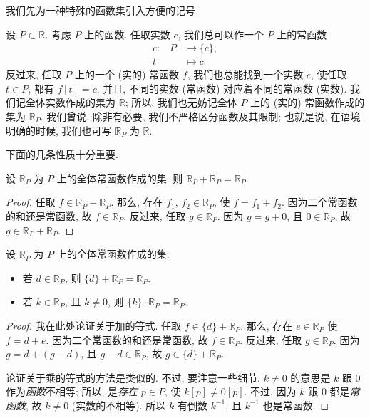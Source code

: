 我们先为一种特殊的函数集引入方便的记号.

设 $P \subset \mathbb{R}$. 考虑 $P$ 上的函数. 任取实数 $c$, 我们总可以作一个 $P$ 上的常函数
\begin{align*}
    \text{$c$:} \quad
    P & \to \{ c \}, \\
    t & \mapsto c.
\end{align*}
反过来, 任取 $P$ 上的一个 (实的) 常函数 $f$, 我们也总能找到一个实数 $c$, 使任取 $t \in P$, 都有 $f[t] = c$. 并且, 不同的实数 (常函数) 对应着不同的常函数 (实数). 我们记全体实数作成的集为 $\mathbb{R}$; 所以, 我们也无妨记全体 $P$ 上的 (实的) 常函数作成的集为 $\mathbb{R}_{P}$. 我们曾说, 除非有必要, 我们不严格区分函数及其限制; 也就是说, 在语境明确的时候, 我们也可写 $\mathbb{R}_{P}$ 为 $\mathbb{R}$.

下面的几条性质十分重要.

\begin{theorem}
    设 $\mathbb{R}_{P}$ 为 $P$ 上的全体常函数作成的集. 则 $\mathbb{R}_{P} + \mathbb{R}_{P} = \mathbb{R}_{P}$.
\end{theorem}

\begin{proof}
    任取 $f \in \mathbb{R}_{P} + \mathbb{R}_{P}$. 那么, 存在 $f_1$, $f_2 \in \mathbb{R}_{P}$, 使 $f = f_1 + f_2$. 因为二个常函数的和还是常函数, 故 $f \in \mathbb{R}_{P}$. 反过来, 任取 $g \in \mathbb{R}_{P}$. 因为 $g = g + 0$, 且 $0 \in \mathbb{R}_{P}$, 故 $g \in \mathbb{R}_{P} + \mathbb{R}_{P}$.
\end{proof}

\begin{theorem}
    设 $\mathbb{R}_{P}$ 为 $P$ 上的全体常函数作成的集.
    \begin{itemize}
        \item 若 $d \in \mathbb{R}_{P}$, 则 $\{ d \} + \mathbb{R}_{P} = \mathbb{R}_{P}$.
        \item 若 $k \in \mathbb{R}_{P}$, 且 $k \neq 0$, 则 $\{ k \} \cdot \mathbb{R}_{P} = \mathbb{R}_{P}$.
    \end{itemize}
\end{theorem}

\begin{proof}
    我在此处论证关于加的等式. 任取 $f \in \{ d \} + \mathbb{R}_{P}$. 那么, 存在 $e \in \mathbb{R}_{P}$ 使 $f = d + e$. 因为二个常函数的和还是常函数, 故 $f \in \mathbb{R}_{P}$. 反过来, 任取 $g \in \mathbb{R}_{P}$. 因为 $g = d + (g - d)$, 且 $g - d \in \mathbb{R}_{P}$, 故 $g \in \{ d \} + \mathbb{R}_{P}$.

    论证关于乘的等式的方法是类似的. 不过, 要注意一些细节. $k \neq 0$ 的意思是 $k$ 跟 $0$ 作为\emph{函数}不相等; 所以, 是\emph{存在} $p \in P$, 使 $k[p] \neq 0[p]$. 不过, 因为 $k$ 跟 $0$ 都是\emph{常函数}, 故 $k \neq 0$ (实数的不相等). 所以 $k$ 有倒数 $k^{-1}$, 且 $k^{-1}$ 也是常函数.
\end{proof}

